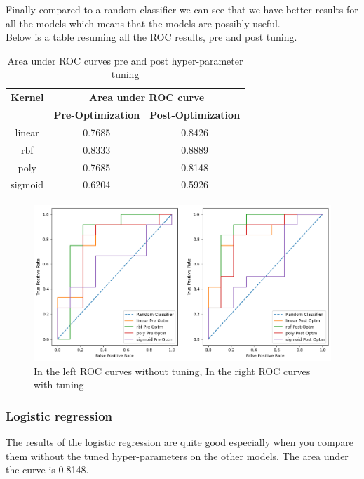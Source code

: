 \documentclass{thesisreport}
\begin{document}
Finally compared to a random classifier we can see that we have better results for all the models which means that the models are possibly useful.\\
Below is a table resuming all the ROC results, pre and post tuning.
\begin{table}[H]
\centering
\begin{tabular}{|c|c|c|}
\hline
\textbf{Kernel} & \multicolumn{2}{c|}{\textbf{Area under ROC curve}} \\
\cline{2-3}
 & \textbf{Pre-Optimization} & \textbf{Post-Optimization} \\
\hline
linear & 0.7685 & 0.8426 \\
rbf & 0.8333 & 0.8889 \\
poly & 0.7685 & 0.8148 \\
sigmoid & 0.6204 & 0.5926 \\
\hline
\end{tabular}
\caption{Area under ROC curves pre and post hyper-parameter tuning}
\label{tab:svm-scores}
\end{table}
\newpage


\begin{figure}[H]
    \centering
    \includegraphics[width=1\linewidth]{figures/roc_curves.png}
    \caption{In the left ROC curves without tuning, In the right ROC curves with tuning}
    \label{fig:roc-before-after-tuning}
\end{figure}
\subsubsection{Logistic regression}
The results of the logistic regression are quite good especially when you compare them without the tuned hyper-parameters on the other models. The area under the curve is 0.8148.
\end{document}
